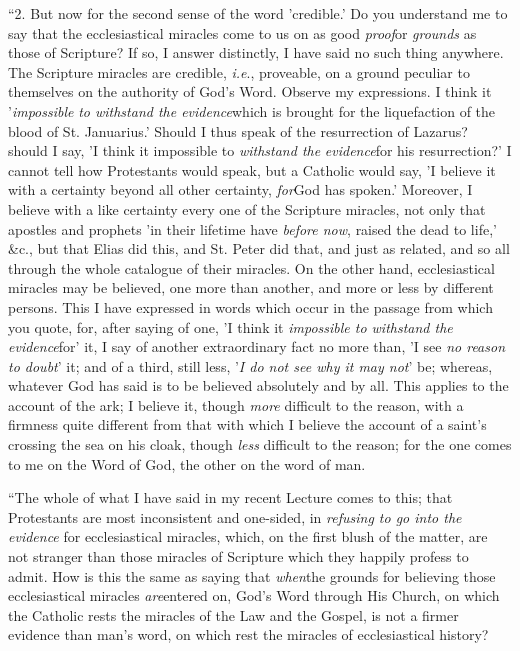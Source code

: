 ``2. But now for the second sense of the word
'credible.' Do you understand me to say that the
ecclesiastical miracles come to us on as good \emph{proof}or
\emph{grounds} as those of Scripture? If so, I answer
distinctly, I have said no such thing anywhere. The
Scripture miracles are credible, \emph{i.e}., proveable,
on a ground peculiar to themselves on the authority of
God's Word. Observe my expressions. I think it '\emph{impossible} \emph{to withstand the evidence}which is brought for the
liquefaction of the blood of St. Januarius.' Should I
thus speak of the resurrection of Lazarus? should I say,
'I think it impossible to \emph{withstand the} \emph{evidence}for his resurrection?' I cannot tell how Protestants
would speak, but a Catholic would say, 'I believe it with
a certainty beyond all other certainty, \emph{for}God
has spoken.' Moreover, I believe with a like certainty
every one of the Scripture miracles, not only that
apostles and prophets 'in their lifetime have \emph{before
now}, raised the dead to life,' \&c., but that
Elias did this, and St. Peter did that, and just as
related, and so all through the whole catalogue of their
miracles. On the other hand, ecclesiastical miracles may
be believed, one more than another, and more or less by
different persons. This I have expressed in words which
occur in the passage from which you quote, for, after
saying of one, 'I think it \emph{impossible to withstand the}
\emph{evidence}for' it, I say of another extraordinary
fact no more than, 'I see \emph{no reason to doubt}' it; and of a third, still less,
'\emph{I do not see
why it may not}' \emph{}be; whereas, whatever God has said is
to be believed absolutely and by all. This applies to the
account of the ark; I believe it, though \emph{more}
difficult to the reason, with a firmness quite different
from that with which I believe the account of a saint's
crossing the sea on his cloak, though \emph{less}
difficult to the reason; for the one comes to me on the
Word of God, the other on the word of man.


``The whole of what I have said in my recent
Lecture comes to this; that Protestants are most
inconsistent and one-sided, in \emph{refusing to go into the
evidence} for ecclesiastical miracles, which, on the
first blush of the matter, are not stranger than those
miracles of Scripture which they happily profess to
admit. How is this the same as saying that \emph{when}the
grounds for believing those ecclesiastical miracles \emph{are}entered on, God's Word through His Church, on which
the Catholic rests the miracles of the Law and the
Gospel, is not a firmer evidence than man's word, on
which rest the miracles of ecclesiastical history?


